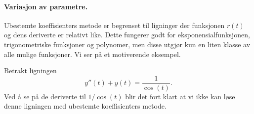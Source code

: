 \documentclass{article}
\theoremstyle{definition}
\newenvironment{ex}
{\pushQED{\qed}\renewcommand{\qedsymbol}{$\triangle$}\exx}
{\popQED\endexx}
\theoremstyle{remark}
\begin{document}
\begin{multicols*}{2}
\paragraph*{Variasjon av parametre.} Ubestemte koeffisienters metode er begrenset til ligninger der funksjonen $r(t)$ og dens deriverte er relativt like. Dette fungerer godt for eksponensialfunksjonen, trigonometriske funksjoner og polynomer, men disse utgjør kun en liten klasse av alle mulige funksjoner. Vi ser på et motiverende eksempel.

\begin{ex} \label{ex:motiverende_eks}
  Betrakt ligningen
  \begin{equation*}
    y''(t) + y(t) = \frac{1}{\cos(t)}.
  \end{equation*}
  Ved å se på de deriverte til $1 / \cos(t)$ blir det fort klart at vi ikke kan løse denne ligningen med ubestemte koeffisienters metode.
\end{ex}


\end{multicols*}
\end{document}
